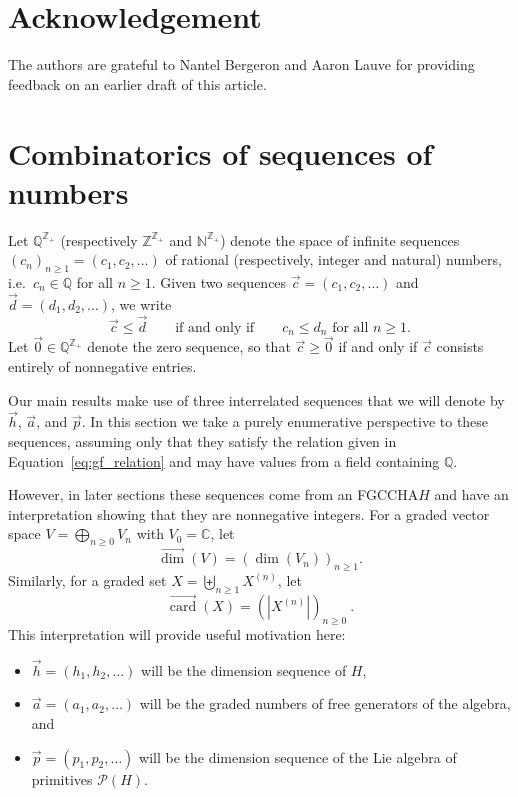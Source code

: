 \documentclass[11pt]{amsart}
\theoremstyle{definition}
\numberwithin{equation}{section}
\def\NN{{\mathbb N}}
\def\CC{{\mathbb C}}
\def\ZZ{{\mathbb Z}}
\def\QQ{{\mathbb Q}}
\newcommand{\FGCCHA}{\textsf{FGCCHA}\xspace}
\newcommand{\vecdim}{\overrightarrow{\dim}}
\newcommand{\veccard}{\overrightarrow{\operatorname{card}}}
\begin{document}
\section*{Acknowledgement}
The authors are grateful to Nantel Bergeron and Aaron Lauve for providing feedback on an earlier draft of this article.

\section{Combinatorics of sequences of numbers}
\label{sec:SequencePrelims}

Let $\QQ^{\ZZ_+}$ (respectively $\ZZ^{\ZZ_+}$ and $\NN^{\ZZ_+}$) denote the space of infinite sequences
$(c_{n})_{n \ge 1} = (c_{1}, c_{2}, \ldots)$ of rational (respectively, integer and natural) numbers,
i.e.~$c_{n} \in \QQ$ for all $n \ge 1$.
Given two sequences $\vec{c} = (c_{1}, c_{2}, \ldots)$ and $\vec{d} = (d_{1}, d_{2}, \ldots)$, we write
\[
\vec{c} \le \vec{d} 
\qquad\text{if and only if}\qquad
\text{$c_{n} \le d_{n}$ for all $n \ge 1$}.
\]
Let $\vec{0} \in \QQ^{\ZZ_+}$ denote the zero sequence, so that $\vec{c} \ge \vec{0}$
if and only if $\vec{c}$ consists entirely of nonnegative entries.

Our main results make use of three interrelated sequences that we will denote by $\vec{h}$, $\vec{a}$, and $\vec{p}$.  
In this section we take a purely enumerative perspective to these sequences, assuming only that they satisfy the relation given in Equation~\eqref{eq:gf_relation} and may have values from a field containing $\QQ$.  

However, in later sections these sequences come from an \FGCCHA $H$
and have an interpretation showing that they are nonnegative integers.
For a graded vector space $V = \bigoplus_{n \ge 0} V_{n}$ with $V_{0} = \CC$, let
\[
\vecdim(V) = \left( \dim(V_{n}) \right)_{n \ge 1}.
\]
Similarly, for a graded set $X = \biguplus_{n \ge 1} X^{(n)}$, let
\[
\veccard(X) = \left( |X^{(n)}| \right)_{n \ge 0}~.
\]
This interpretation will provide useful motivation here:
\begin{itemize}
\item $\vec{h} = (h_{1}, h_{2}, \ldots)$ will be the dimension sequence of $H$,

\item $\vec{a} = (a_{1}, a_{2}, \ldots)$ will be the graded numbers of free generators of the algebra, and 

\item $\vec{p} = (p_{1}, p_{2}, \ldots)$ will be the dimension sequence of the Lie algebra of primitives $\mathcal{P}(H)$.

\end{itemize}
\end{document}
